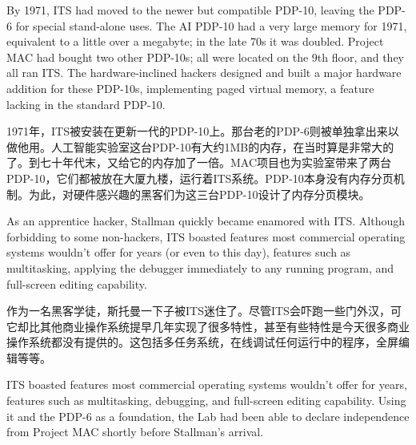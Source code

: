\ifdefined\vtwo
\ifdefined\eng
By 1971, ITS had moved to the newer but compatible PDP-10, leaving the PDP-6 for special stand-alone uses. The AI PDP-10 had a very large memory for 1971, equivalent to a little over a megabyte; in the late 70s it was doubled.   Project MAC had bought two other PDP-10s; all were located on the 9th floor, and they all ran ITS.  The hardware-inclined hackers designed and built a major hardware addition for these PDP-10s, implementing paged virtual memory, a feature lacking in the standard PDP-10.
\fi

\ifdefined\chs
1971年，ITS被安装在更新一代的PDP-10上。那台老的PDP-6则被单独拿出来以做他用。人工智能实验室这台PDP-10有大约1MB的内存，在当时算是非常大的了。到七十年代末，又给它的内存加了一倍。MAC项目也为实验室带来了两台PDP-10，它们都被放在大厦九楼，运行着ITS系统。PDP-10本身没有内存分页机制。为此，对硬件感兴趣的黑客们为这三台PDP-10设计了内存分页模块。
\fi

\ifdefined\eng
As an apprentice hacker, Stallman quickly became enamored with ITS. Although forbidding to some non-hackers, ITS boasted features most commercial operating systems wouldn't offer for years (or even to this day), features such as multitasking, applying the debugger immediately to any running program, and full-screen editing capability. 
\fi

\ifdefined\chs
作为一名黑客学徒，斯托曼一下子被ITS迷住了。尽管ITS会吓跑一些门外汉，可它却比其他商业操作系统提早几年实现了很多特性，甚至有些特性是今天很多商业操作系统都没有提供的。这包括多任务系统，在线调试任何运行中的程序，全屏编辑等等。
\fi
\fi

\ifdefined\vone
\ifdefined\eng
ITS boasted features most commercial operating systems wouldn't offer for years, features such as multitasking, debugging, and full-screen editing capability. Using it and the PDP-6 as a foundation, the Lab had been able to declare independence from Project MAC shortly before Stallman's arrival.
\fi

